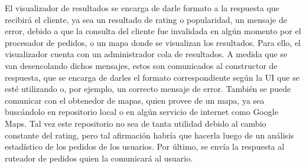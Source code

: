 El visualizador de resultados se encarga de darle formato a la respuesta que recibirá el cliente, ya sea un resultado de rating o popularidad, un mensaje de error, debido a que la consulta del cliente fue invalidada en algún momento por el procesador de pedidos, o un mapa donde se visualizan los resultados. Para ello, el visualizador cuenta con un administrador cola de resultados. A medida que se van desencolando dichos mensajes, estos son comunicados al constructor de respuesta, que se encarga de darles el formato correspondiente según la UI que se esté utilizando o, por ejemplo, un correcto mensaje de error. También se puede comunicar con el obtenedor de mapas, quien provee de un mapa, ya sea buscándolo en repositorio local o en algún servicio de internet como Google Maps. Tal vez este repositorio no sea de tanta utilidad debido al cambio constante del rating, pero tal afirmación habría que hacerla luego de un análisis estadístico de los pedidos de los usuarios. Por último, se envía la respuesta al 
ruteador de pedidos quien la comunicará al usuario.

